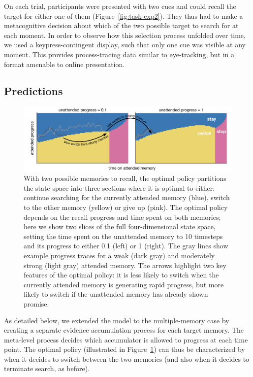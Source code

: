 On each trial, participants were presented with two cues and could recall the target for either one of them (Figure~\ref{fig:task-exp2}). They thus had to make a metacognitive decision about which of the two possible target to search for at each moment. In order to observe how this selection process unfolded over time, we used a keypress-contingent display, such that only one cue was visible at any moment. This provides process-tracing data similar to eye-tracking, but in a format amenable to online presentation.

\subsection{Predictions}

\begin{figure}[t!]
  \centering
  \includegraphics[width=\textwidth]{figs/memory/exp2_predictions.pdf}
  \caption{ With two possible memories to recall, the optimal policy partitions the state space into three sections where it is optimal to either: continue searching for the currently attended memory (blue), switch to the other memory (yellow) or give up (pink). The optimal policy depends on the recall progress and time spent on both memories; here we show two slices of the full four-dimensional state space, setting the time spent on the unattended memory to 10 timesteps and its progress to either 0.1 (left) or 1 (right). The gray lines show example progress traces for a weak (dark gray) and moderately strong (light gray) attended memory. The arrows highlight two key features of the optimal policy: it is less likely to switch when the currently attended memory is generating rapid progress, but more likely to switch if the unattended memory has already shown promise.}
  \label{fig:exp2_predictions}
\end{figure}

As detailed below, we extended the model to the multiple-memory case by creating a separate evidence accumulation process for each target memory. The meta-level process decides which accumulator is allowed to progress at each time point. The optimal policy (illustrated in Figure~\ref{fig:exp2_predictions}) can thus be characterized by when it decides to switch between the two memories (and also when it decides to terminate search, as before). 

